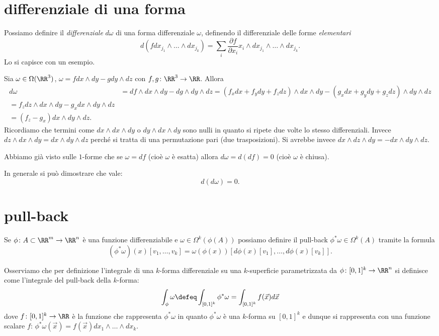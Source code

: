 \section{differenziale di una forma}

Possiamo definire il \emph{differenziale} $d\omega$ di una forma differenziale $\omega$, 
definendo il differenziale delle forme \emph{elementari}
\[
  d( f dx_{j_1} \wedge \dots  \wedge dx_{j_k})
  = \sum_i \frac{\partial f}{\partial x_i} x_i \wedge dx_{j_1} \wedge \dots \wedge dx_{j_k}.
\]
Lo si capisce con un esempio.

\begin{example}
Sia $\omega\in \Omega(\RR^3)$, $\omega = f dx \wedge dy - g dy\wedge dz$ con $f,g\colon \RR^3\to \RR$.
Allora 
\begin{align*}
  d\omega 
  &= df \wedge dx \wedge dy - dg \wedge dy \wedge dz
  = (f_x dx + f_y dy + f_z dz) \wedge dx \wedge dy - (g_x dx + g_y dy + g_z dz)\wedge dy \wedge dz\\
  = f_z dz\wedge dx \wedge dy - g_x dx \wedge dy \wedge dz \\
  = (f_z - g_x) dx \wedge dy \wedge dz.
\end{align*}
Ricordiamo che termini come $dx\wedge dx \wedge dy$ o $dy \wedge dx \wedge dy$ sono nulli in quanto 
si ripete due volte lo stesso differenziali. 
Invece $dz\wedge dx \wedge dy = dx \wedge dy \wedge dz$ perché si tratta di una permutazione 
pari (due trasposizioni). Si avrebbe invece $dx\wedge dz\wedge dy = - dx\wedge dy\wedge dz$.
\end{example} 

Abbiamo già visto sulle $1$-forme che se $\omega = df$ (cioè $\omega$ è esatta) 
allora $d\omega = d(df) = 0$ (cioè $\omega$ è chiusa).

In generale si può dimostrare che vale:
\[
  d(d\omega) = 0.
\]

\section{pull-back}

Se $\phi\colon A\subset \RR^m \to \RR^n$ è una funzione differenziabile e $\omega\in \Omega^k(\phi(A))$
possiamo definire il pull-back $\phi^* \omega \in \Omega^k(A)$ tramite la formula
\[
  (\phi^* \omega)(x)[v_1,\dots,v_k] = \omega(\phi(x))[d\phi(x)[v_1],\dots, d\phi(x)[v_k]].
\]

Osserviamo che per definizione l'integrale di una $k$-forma differenziale 
su una $k$-superficie parametrizzata da $\phi\colon [0,1]^k \to \RR^n$
si definisce come l'integrale del pull-back della $k$-forma:
\[ 
  \int_\phi \omega \defeq \int_{[0,1]^k} \phi^* \omega
  = \int_{[0,1]^k} f(\vec x) d\vec x
\]
dove $f\colon [0,1]^k \to \RR$ è la funzione che rappresenta $\phi^* \omega$
in quanto $\phi^* \omega$ è una $k$-forma su $[0,1]^k$ e dunque si rappresenta 
con una funzione scalare $f$: $\phi^* \omega(\vec x) = f(\vec x) dx_1 \wedge \dots \wedge dx_k$.

